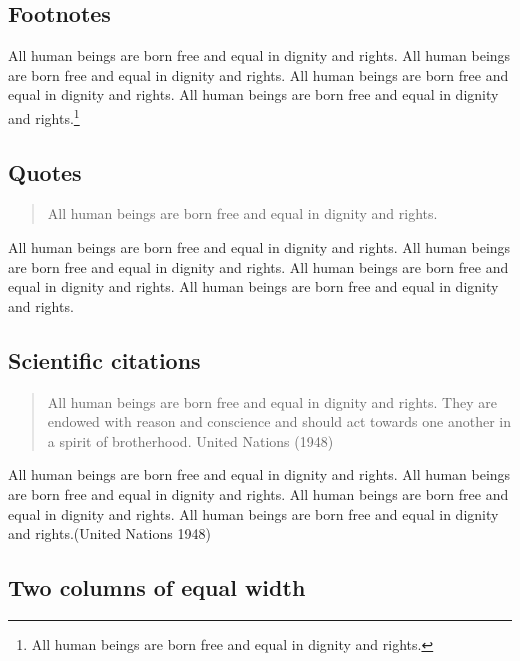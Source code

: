 \documentclass[
  english,
  american,
]{beamer}
\begin{document}
\subsection{Footnotes}\label{footnotes}

All human beings are born free and equal in dignity and rights. All
human beings are born free and equal in dignity and rights. All human
beings are born free and equal in dignity and rights. All human beings
are born free and equal in dignity and rights.\footnote{All human beings
  are born free and equal in dignity and rights.}

\subsection{Quotes}\label{quotes}

\begin{quote}
All human beings are born free and equal in dignity and rights.
\end{quote}

All human beings are born free and equal in dignity and rights. All
human beings are born free and equal in dignity and rights. All human
beings are born free and equal in dignity and rights. All human beings
are born free and equal in dignity and rights.

\subsection{Scientific citations}\label{scientific-citations}

\begin{otherlanguage}{english}

\begin{quote}
All human beings are born free and equal in dignity and rights. They are
endowed with reason and conscience and should act towards one another in
a spirit of brotherhood. United Nations (1948)
\end{quote}

\end{otherlanguage}

All human beings are born free and equal in dignity and rights. All
human beings are born free and equal in dignity and rights. All human
beings are born free and equal in dignity and rights. All human beings
are born free and equal in dignity and rights.(United Nations 1948)

\subsection{Two columns of equal
width}\label{two-columns-of-equal-width}
\end{document}
